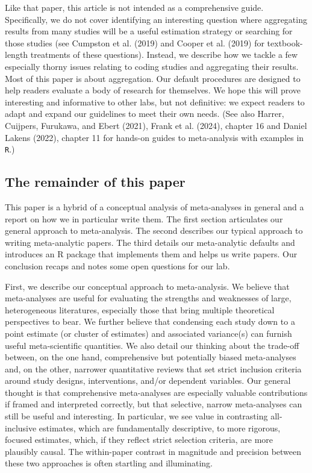 \documentclass[
  ,jou]{apa6}
\begin{document}
Like that paper, this article is not intended as a comprehensive guide. Specifically, we do not cover identifying an interesting question where aggregating results from many studies will be a useful estimation strategy or searching for those studies (see Cumpston et al. (2019) and Cooper et al. (2019) for textbook-length treatments of these questions). Instead, we describe how we tackle a few especially thorny issues relating to coding studies and aggregating their results. Most of this paper is about aggregation. Our default procedures are designed to help readers evaluate a body of research for themselves. We hope this will prove interesting and informative to other labs, but not definitive: we expect readers to adapt and expand our guidelines to meet their own needs. (See also Harrer, Cuijpers, Furukawa, and Ebert (2021), Frank et al. (2024), chapter 16 and Daniel Lakens (2022), chapter 11 for hands-on guides to meta-analysis with examples in \texttt{R}.)

\subsection{The remainder of this paper}\label{the-remainder-of-this-paper}

This paper is a hybrid of a conceptual analysis of meta-analyses in general and a report on how we in particular write them. The first section articulates our general approach to meta-analysis. The second describes our typical approach to writing meta-analytic papers. The third details our meta-analytic defaults and introduces an R package that implements them and helps us write papers. Our conclusion recaps and notes some open questions for our lab.

First, we describe our conceptual approach to meta-analysis. We believe that meta-analyses are useful for evaluating the strengths and weaknesses of large, heterogeneous literatures, especially those that bring multiple theoretical perspectives to bear. We further believe that condensing each study down to a point estimate (or cluster of estimates) and associated variance(s) can furnish useful meta-scientific quantities. We also detail our thinking about the trade-off between, on the one hand, comprehensive but potentially biased meta-analyses and, on the other, narrower quantitative reviews that set strict inclusion criteria around study designs, interventions, and/or dependent variables. Our general thought is that comprehensive meta-analyses are especially valuable contributions if framed and interpreted correctly, but that selective, narrow meta-analyses can still be useful and interesting. In particular, we see value in contrasting all-inclusive estimates, which are fundamentally descriptive, to more rigorous, focused estimates, which, if they reflect strict selection criteria, are more plausibly causal. The within-paper contrast in magnitude and precision between these two approaches is often startling and illuminating.
\end{document}
